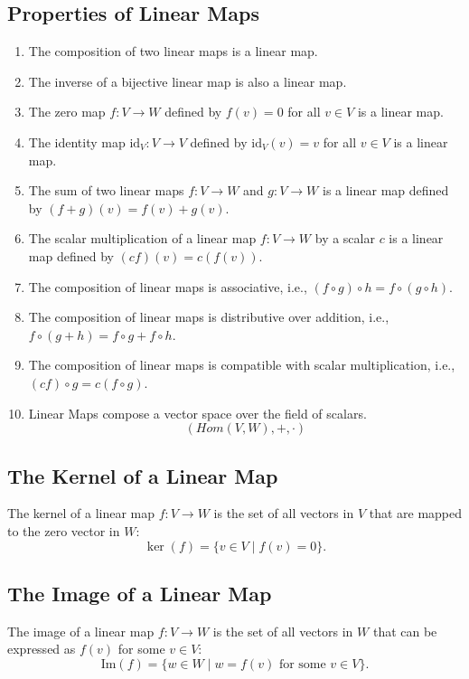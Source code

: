 \subsection{Properties of Linear Maps}
\begin{enumerate}
    \item The composition of two linear maps is a linear map.
    \item The inverse of a bijective linear map is also a linear map.
    \item The zero map \( f: V \to W \) defined by \( f(v) = 0 \) 
    for all \( v \in V \) is a linear map.
    \item The identity map \( \text{id}_V: V \to V \) defined by \( \text{id}_V(v) = v \) for all \( v \in V \) is a linear map.
    \item The sum of two linear maps \( f: V \to W \) 
    and \( g: V \to W \) is a linear map defined by \( (f + g)(v) = f(v) + g(v) \).
    \item The scalar multiplication of a linear map \( f: V \to W \) by a scalar \( c \) is a linear map defined by \( (cf)(v) = c(f(v)) \).
    \item The composition of linear maps is associative, i.e., \( (f \circ g) \circ h = f \circ (g \circ h) \).
    \item The composition of linear maps is distributive over addition, i.e., \( f \circ (g + h) = f \circ g + f \circ h \).
    \item The composition of linear maps is compatible with scalar multiplication, i.e., \( (cf) \circ g = c(f \circ g) \).
    \item Linear Maps compose a vector space 
    over the field of scalars.
    \[
    (Hom(V,W), +, \cdot )
    \]
\end{enumerate}

\subsection{The Kernel of a Linear Map}
The kernel of a linear map \( f: V \to W \) is the set of all vectors in \( V \) that are mapped to the zero vector in \( W \):
    \[
    \ker(f) = \{ v \in V \mid f(v) = 0 \}.
    \]

\subsection{The Image of a Linear Map}
The image of a linear map \( f: V \to W \) is the set of all vectors in \( W \) that can be expressed as \( f(v) \) for some \( v \in V \):
    \[
    \text{Im}(f) = \{ w \in W \mid w = f(v) \text{ for some } v \in V \}.
    \]
 
